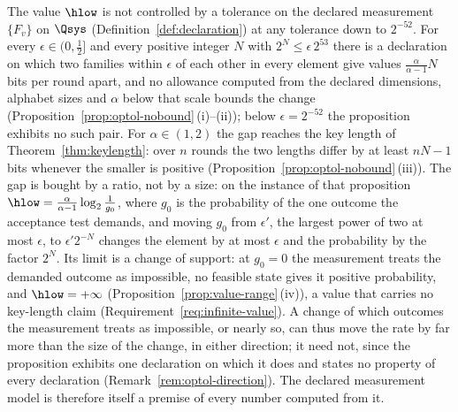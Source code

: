 \begin{remark}\label{rem:declared-measurement}
The value $\hlow$ is not controlled by a tolerance on the declared
measurement $\{F_v\}$ on $\Qsys$ (Definition~\ref{def:declaration}) at any
tolerance down to $2^{-52}$. For every $\epsilon\in(0,\tfrac12]$ and
every positive integer $N$ with $2^{N}\le\epsilon\,2^{53}$ there is a
declaration on which two  families within
$\epsilon$ of each other in every element give values
$\frac{\alpha}{\alpha-1}N$ bits per round apart, and no allowance computed
from the declared dimensions, alphabet sizes and $\alpha$ below that scale
bounds the change (Proposition~\ref{prop:optol-nobound}\,(i)--(ii)); below
$\epsilon=2^{-52}$ the proposition exhibits no such pair. For
$\alpha\in(1,2)$ the gap reaches the key length of
Theorem~\ref{thm:keylength}: over $n$ rounds the two lengths differ by at
least $nN-1$ bits whenever the smaller is positive
(Proposition~\ref{prop:optol-nobound}\,(iii)). The gap is bought by a ratio,
not by a size: on the instance of that proposition
$\hlow=\frac{\alpha}{\alpha-1}\log_2\frac1{g_0}$, where $g_0$ is the
probability of the one outcome the acceptance test demands, and moving
$g_0$ from $\epsilon'$, the largest power of two at most $\epsilon$, to
$\epsilon'2^{-N}$ changes the element by at most $\epsilon$ and the
probability by the factor $2^{N}$. Its limit is a change of support: at
$g_0=0$ the measurement treats the demanded outcome as impossible, no
feasible state gives it positive probability, and $\hlow=+\infty$
(Proposition~\ref{prop:value-range}\,(iv)), a value that carries no
key-length claim (Requirement~\ref{req:infinite-value}). A change of which
outcomes the measurement treats as impossible, or nearly so, can thus move
the rate by far more than the size of the change, in either direction; it
need not, since the proposition exhibits one declaration on which it does
and states no property of every declaration
(Remark~\ref{rem:optol-direction}). The declared measurement model is
therefore itself a premise of every number computed from it.


\end{remark}
